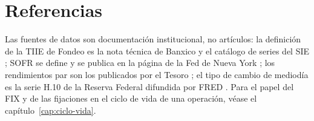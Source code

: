 \begin{sloppypar}
\section{Referencias}\label{sec:cap13-referencias}

Las fuentes de datos son documentación institucional, no artículos: la definición de la TIIE de Fondeo es la nota
técnica de Banxico \citep{banxico2021} y el catálogo de series del SIE \citep{banxico2026a,banxico2026b}; SOFR se
define y se publica en la página de la Fed de Nueva York \citep{nyfed2026}; los rendimientos par son los
publicados por el Tesoro \citep{treasury2026}; el tipo de cambio de mediodía es la serie H.10 de la Reserva
Federal difundida por FRED \citep{fred2026}. Para el papel del FIX y de las fijaciones en el ciclo de vida de una
operación, véase el capítulo~\ref{cap:ciclo-vida}.
\end{sloppypar}
